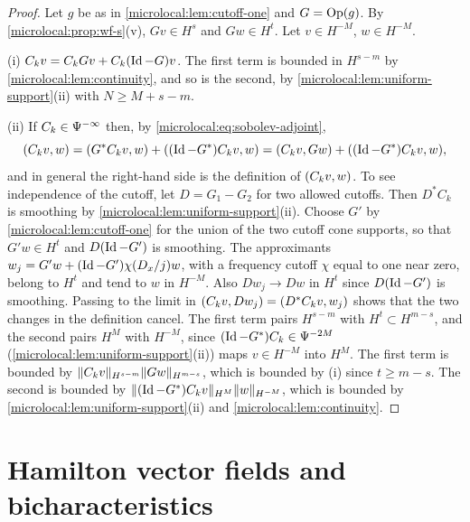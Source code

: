 \begin{proof}
  Let $g$ be as in \cref{microlocal:lem:cutoff-one} and $G=\operatorname{Op}(g)$. By
  \cref{microlocal:prop:wf-s}(v), $Gv\in H^s$ and $Gw\in H^t$. Let $v\in H^{-M}$,
  $w\in H^{-M}$.

  (i) $C_kv=C_kGv+C_k(\operatorname{Id}-G)v$. The first term is bounded in $H^{s-m}$ by
  \cref{microlocal:lem:continuity}, and so is the second, by
  \cref{microlocal:lem:uniform-support}(ii) with $N\ge M+s-m$.

  (ii) If $C_k\in\Psi^{-\infty}$ then, by \eqref{microlocal:eq:sobolev-adjoint},
  \begin{equation*}
    ( C_kv, w)=( G^*C_kv, w)+( (\operatorname{Id}-G^*)C_kv, w)
    =( C_kv, Gw)+( (\operatorname{Id}-G^*)C_kv, w) ,
  \end{equation*}
  and in general the right-hand side is the definition of $( C_kv, w)$.
  To see independence of the cutoff, let $D=G_1-G_2$ for two allowed
  cutoffs. Then $D^*C_k$ is smoothing by
  \cref{microlocal:lem:uniform-support}(ii). Choose $G'$ by
  \cref{microlocal:lem:cutoff-one} for the union of the two cutoff cone
  supports, so that $G'w\in H^t$ and $D(\operatorname{Id}-G')$ is smoothing.
  The approximants $w_j=G'w+(\operatorname{Id}-G')\chi(D_x/j)w$, with a frequency cutoff
  $\chi$ equal to one near zero, belong to $H^t$ and tend to $w$ in $H^{-M}$.
  Also $Dw_j\to Dw$ in $H^t$ since $D(\operatorname{Id}-G')$ is smoothing. Passing to the
  limit in $( C_kv, Dw_j)=( D^*C_kv, w_j)$ shows that the two
  changes in the definition cancel.
  The first term pairs $H^{s-m}$ with $H^t\subset H^{m-s}$, and the second
  pairs $H^M$ with $H^{-M}$, since $(\operatorname{Id}-G^*)C_k\in\Psi^{-2M}$
  (\cref{microlocal:lem:uniform-support}(ii)) maps $v\in H^{-M}$ into $H^M$.
  The first term is bounded by $\lVert C_kv\rVert_{H^{s-m}}\lVert Gw\rVert_{H^{m-s}}$, which
  is bounded by (i) since $t\ge m-s$. The second is bounded by
  $\lVert (\operatorname{Id}-G^*)C_kv\rVert_{H^M}\lVert w\rVert_{H^{-M}}$, which is bounded by
  \cref{microlocal:lem:uniform-support}(ii) and
  \cref{microlocal:lem:continuity}.
\end{proof}

\section{Hamilton vector fields and bicharacteristics}\label{microlocal:sec:hamilton}

